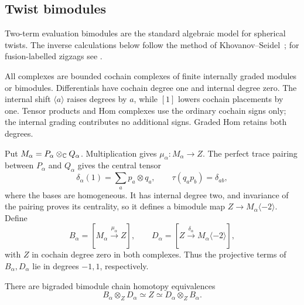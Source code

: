 \subsection{Twist bimodules}

Two-term evaluation bimodules are the standard algebraic model for
spherical twists.  The inverse calculations below follow the method of
Khovanov--Seidel~\cite[Section~2d, Proposition~2.4]{KhovanovSeidel2002};
for fusion-labelled zigzags see
\cite[Definition~5.2, Proposition~5.3]{HengLicata2024}.

All complexes are bounded cochain complexes of finite internally
graded modules or bimodules. Differentials have cochain degree one and
internal degree zero. The internal shift $\langle a\rangle$ raises
degrees by $a$, while $[1]$ lowers cochain placements by one. Tensor
products and Hom complexes use the ordinary cochain signs only; the
internal grading contributes no additional signs. Graded Hom retains
both degrees.

Put $M_\alpha=P_\alpha\otimes_\mathbb C Q_\alpha$. Multiplication gives
$\mu_\alpha:M_\alpha\to Z$. The perfect trace pairing between
$P_\alpha$ and $Q_\alpha$ gives the central tensor
\[
 \delta_\alpha(1)=\sum_a p_a\otimes q_a,
 \qquad \tau(q_ap_b)=\delta_{ab},
\]
where the bases are homogeneous. It has internal degree two, and
invariance of the pairing proves its centrality, so it defines a
bimodule map $Z\to M_\alpha\langle-2\rangle$. Define
\begin{equation}
 B_\alpha=[M_\alpha\xrightarrow{\mu_\alpha} Z],
 \qquad
 D_\alpha=[Z\xrightarrow{\delta_\alpha}
                   M_\alpha\langle-2\rangle],
 \label{eq:category-twists}
\end{equation}
with $Z$ in cochain degree zero in both complexes. Thus the projective
terms of $B_\alpha,D_\alpha$ lie in degrees $-1,1$, respectively.

\begin{lemma}
\label{lem:category-twist-inverse}
There are bigraded bimodule chain homotopy equivalences
\[
 B_\alpha\otimes_ZD_\alpha\simeq Z
       \simeq D_\alpha\otimes_ZB_\alpha.
\]
\end{lemma}

